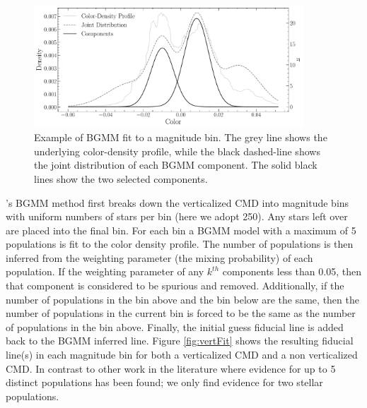 \begin{figure}
	\centering
	\includegraphics[width=0.9\textwidth]{figures/ngc2808/BGMMMixingBin.pdf}
	\caption{Example of BGMM fit to a magnitude bin. The grey line shows the
	underlying color-density profile, while the black dashed-line shows the
	joint distribution of each BGMM component. The solid black lines show the
	two selected components.}
	\label{fig:BGMMDist}
\end{figure}

\fidanka's BGMM method first breaks down the verticalized CMD into magnitude
bins with uniform numbers of stars per bin (here we adopt 250). Any stars left
over are placed into the final bin. For each bin a BGMM model with a maximum of
5 populations is fit to the color density profile. The number of populations is
then inferred from the weighting parameter (the mixing probability) of each
population. If the weighting parameter of any $k^{th}$ components less than
{\color{blue}0.05}, then that component is considered to be spurious and
removed. Additionally, if the number of populations in the bin above and the
bin below are the same, then the number of populations in the current bin is
forced to be the same as the number of populations in the bin above. Finally,
the initial guess fiducial line is added back to the BGMM inferred line. Figure
\ref{fig:vertFit} shows the resulting fiducial line(s) in each magnitude bin
for both a verticalized CMD and a non verticalized CMD. In contrast to other
work in the literature where evidence for up to 5 distinct populations has been
found; we only find evidence for two stellar populations.

